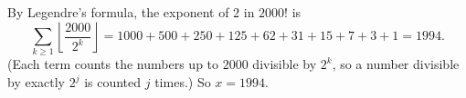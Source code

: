 By Legendre's formula, the exponent of $2$ in $2000!$ is
\[
\sum_{k\ge1}\left\lfloor\dfrac{2000}{2^k}\right\rfloor=1000+500+250+125+62+31+15+7+3+1=1994 .
\]
(Each term counts the numbers up to $2000$ divisible by $2^k$, so a number divisible by exactly $2^j$ is counted $j$ times.) So $x=\boxed{1994}$.
